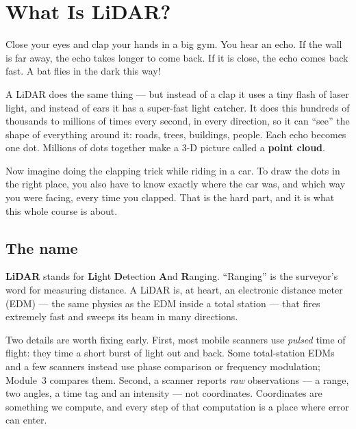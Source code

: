 \chapter{What Is LiDAR?}

\begin{kid}
Close your eyes and clap your hands in a big gym. You hear an echo. If the wall is far away, the echo takes longer to come back. If it is close, the echo comes back fast. A bat flies in the dark this way!

A LiDAR does the same thing --- but instead of a clap it uses a tiny flash of laser light, and instead of ears it has a super-fast light catcher. It does this hundreds of thousands to millions of times every second, in every direction, so it can ``see'' the shape of everything around it: roads, trees, buildings, people. Each echo becomes one dot. Millions of dots together make a 3-D picture called a \textbf{point cloud}.

Now imagine doing the clapping trick while riding in a car. To draw the dots in the right place, you also have to know exactly where the car was, and which way you were facing, every time you clapped. That is the hard part, and it is what this whole course is about.
\end{kid}

\section{The name}

\textbf{LiDAR} stands for \textbf{Li}ght \textbf{D}etection \textbf{A}nd \textbf{R}anging. ``Ranging'' is the surveyor's word for measuring distance. A LiDAR is, at heart, an electronic distance meter (EDM) --- the same physics as the EDM inside a total station --- that fires extremely fast and sweeps its beam in many directions.

Two details are worth fixing early. First, most mobile scanners use \emph{pulsed} time of flight: they time a short burst of light out and back. Some total-station EDMs and a few scanners instead use phase comparison or frequency modulation; Module~3 compares them. Second, a scanner reports \emph{raw} observations --- a range, two angles, a time tag and an intensity --- not coordinates. Coordinates are something we compute, and every step of that computation is a place where error can enter.


